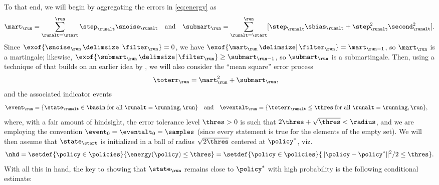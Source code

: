 To that end, we will begin by aggregating the errors in \eqref{eq:energy} as
\begin{equation}
\label{eq:err-agg}
\curr[\mart]
	= \sum_{\runalt=\start}^{\run} \iter[\step] \iter[\snoise]
	\quad
	\text{and}
	\quad
\curr[\submart]
	= \sum_{\runalt=\start}^{\run} \bracks{\iter[\step] \iter[\sbias] + \iter[\step]^{2} \iter[\second]^{2}}.
\end{equation}
Since $\exof{\curr[\snoise] \given \curr[\filter]} = 0$, we have $\exof{\curr[\mart] \given \curr[\filter]} = \prev[\mart]$, so $\curr[\mart]$ is a martingale;
likewise, $\exof{\curr[\submart] \given \curr[\filter]} \geq \prev[\submart]$, so $\curr[\submart]$ is a submartingale.
Then, using a technique of \citet{HIMM19} that builds on an earlier idea by \citet{MZ19}, we will also consider the ``mean square'' error process
\begin{align}
\label{eq:noise-tot}
\curr[\toterr]
	&= \curr[\mart]^{2}
		+ \curr[\submart],
\end{align}
and the associated indicator events
\begin{subequations}
\label{eq:events}
\begin{align}
\curr[\event]
	&= \braces*{\iter\in\basin \; \text{for all $\runalt=\running,\run$}}
	\quad
	\text{and}
	\quad
\curr[\eventalt]
	= \braces*{\iter[\toterr] \leq \thres \; \text{for all $\runalt = \running,\run$}},
\end{align}
\end{subequations}
where, with a fair amount of hindsight,
the error tolerance level $\thres>0$ is such that $2\thres + \sqrt{\thres} < \radius$, and we are employing the convention $\event_{0} = \eventalt_{0} = \samples$ (since every statement is true for the elements of the empty set).
We will then assume that $\init$ is initialized in a ball of radius $\sqrt{2\thres}$ centered at $\eq$, viz.
\begin{equation}
\label{eq:nhd-init}
\nhd
	= \setdef{\policy\in\policies}{\energy(\policy) \leq \thres}
	= \setdef{\policy\in\policies}{\norm{\policy-\eq}^{2}/2 \leq \thres}.
\end{equation}
With all this in hand, the key to showing that $\curr$ remains close to $\eq$ with high probability is the following conditional estimate:

